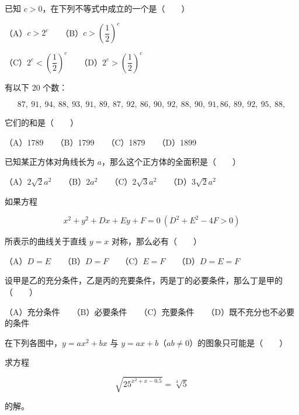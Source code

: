 \begin{question}
已知 $c>0$，在下列不等式中成立的一个是\mbox{（　　）}

（A）$c>2^c$　　（B）$c>\left(\dfrac12\right)^c$

（C）$2^c<\left(\dfrac12\right)^c$　　（D）$2^c>\left(\dfrac12\right)^c$

\end{question}
\begin{question}
有以下 20 个数：

\nopagebreak[4]
\[
87,\ 91,\ 94,\ 88,\ 93,\ 91,\ 89,\ 87,\ 92,\ 86,\ 90,\ 92,\ 88,\ 90,\ 91,
86,\ 89,\ 92,\ 95,\ 88,
\]

它们的和是\mbox{（　　）}

（A）1789　　（B）1799　　（C）1879　　（D）1899

\end{question}
\begin{question}
已知某正方体对角线长为 $a$，那么这个正方体的全面积是\mbox{（　　）}

（A）$2\sqrt2a^2$　　（B）$2a^2$　　（C）$2\sqrt3a^2$　　（D）$3\sqrt2a^2$

\end{question}
\begin{question}
如果方程

\nopagebreak[4]
\[
x^2+y^2+Dx+Ey+F=0\ (D^2+E^2-4F>0)
\]

所表示的曲线关于直线 $y=x$ 对称，那么必有\mbox{（　　）}

（A）$D=E$　　（B）$D=F$　　（C）$E=F$　　（D）$D=E=F$

\end{question}
\begin{question}
设甲是乙的充分条件，乙是丙的充要条件，丙是丁的必要条件，那么丁是甲的\mbox{（　　）}

（A）充分条件　　（B）必要条件　　（C）充要条件　　（D）既不充分也不必要的条件

\Needspace{0.4\textheight}
\end{question}
\begin{question}
在下列各图中，$y=ax^2+bx$ 与 $y=ax+b$（$ab\ne0$）的图象只可能是\mbox{（　　）}
\nopagebreak[4]
\begin{center}\end{center}
\nopagebreak[4]
\end{question}
\begin{question}
求方程

\nopagebreak[4]
\[
\sqrt{25^{x^2+x-0.5}}=\sqrt[4]{5}
\]

的解。

\end{question}
